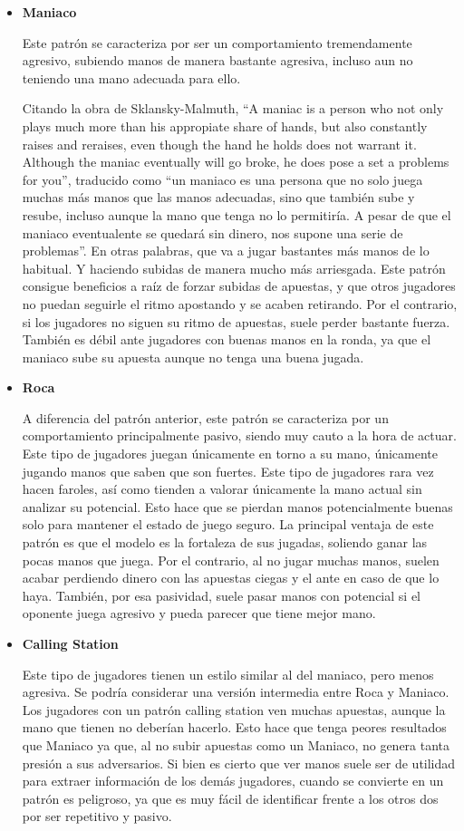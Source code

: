 \begin{itemize}
\item \textbf{Maniaco}

Este patrón se caracteriza por ser un comportamiento tremendamente agresivo, subiendo manos de manera bastante agresiva, incluso aun no teniendo una mano adecuada para ello. 

Citando la obra de Sklansky-Malmuth, “A maniac is a person who not only plays much more than his appropiate share of hands, but also constantly raises and reraises, even though the hand he holds does not warrant it. Although the maniac eventually will go broke, he does pose a set a problems for you”\cite{sklansky}, traducido como “un maniaco es una persona que no solo juega muchas más manos que las manos adecuadas, sino que también sube y resube, incluso aunque la mano que tenga no lo permitiría. A pesar de que el maniaco eventualente se quedará sin dinero, nos supone una serie de problemas”. 
En otras palabras, que va a jugar bastantes más manos de lo habitual. Y haciendo subidas de manera mucho más arriesgada. 
Este patrón consigue beneficios a raíz de forzar subidas de apuestas, y que otros jugadores no puedan seguirle el ritmo apostando y se acaben retirando. Por el contrario, si los jugadores no siguen su ritmo de apuestas, suele perder bastante fuerza. También es débil ante jugadores con buenas manos en la ronda, ya que el maniaco sube su apuesta aunque no tenga una buena jugada.

\item \textbf{Roca}

A diferencia del patrón anterior, este patrón se caracteriza por un comportamiento principalmente pasivo, siendo muy cauto a la hora de actuar. 
Este tipo de jugadores juegan únicamente en torno a su mano, únicamente jugando manos que saben que son fuertes. Este tipo de jugadores rara vez hacen faroles, así como tienden a valorar únicamente la mano actual sin analizar su potencial. Esto hace que se pierdan manos potencialmente buenas solo para mantener el estado de juego seguro.
La principal ventaja de este patrón es que el modelo es la fortaleza de sus jugadas, soliendo ganar las pocas manos que juega. Por el contrario, al no jugar muchas manos, suelen acabar perdiendo dinero con las apuestas ciegas y el ante en caso de que lo haya. También, por esa pasividad, suele pasar manos con potencial si el oponente juega agresivo y pueda parecer que tiene mejor mano.

\item \textbf{Calling Station}

Este tipo de jugadores tienen un estilo similar al del maniaco, pero menos agresiva. Se podría considerar una versión intermedia entre Roca y Maniaco. Los jugadores con un patrón calling station ven muchas apuestas, aunque la mano que tienen no deberían hacerlo. Esto hace que tenga peores resultados que Maniaco ya que, al no subir apuestas como un Maniaco, no genera tanta presión a sus adversarios.
Si bien es cierto que ver manos suele ser de utilidad para extraer información de los demás jugadores, cuando se convierte en un patrón es peligroso, ya que es muy fácil de identificar frente a los otros dos por ser repetitivo y pasivo. 
\end{itemize}

